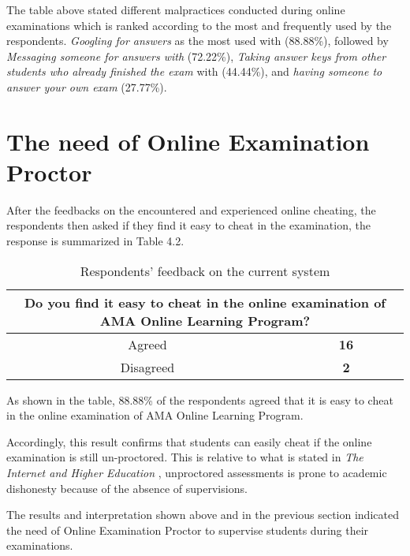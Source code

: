 The table above stated different malpractices conducted during online examinations which is ranked according to the most and frequently used by the respondents.
\emph{Googling for answers} as the most used with (88.88\%), followed by \emph{Messaging someone for answers with} (72.22\%), \emph{Taking answer keys from other students who already finished the exam} with (44.44\%), and \emph{having someone to answer your own exam} (27.77\%).

\section{The need of Online Examination Proctor}

After the feedbacks on the encountered and experienced online cheating, the respondents then asked if they find it easy to cheat in the examination, the response is summarized in Table 4.2.

\begin{table}[h!]
   \begin{center}
      \begin{tabular}{|c|c|}
         \hline
         \multicolumn{2}{|m{20em}|}{Do you find it easy to cheat in the online examination of AMA Online Learning Program?} \\
         \hline
         Agreed    & \textbf{16}                                                                                            \\
         \hline
         Disagreed & \textbf{2}                                                                                             \\
         \hline
      \end{tabular}
   \end{center}
   \caption{Respondents' feedback on the current system}
\end{table}

As shown in the table, 88.88\% of the respondents agreed that it is easy to cheat in the online examination of AMA Online Learning Program.

Accordingly, this result confirms that students can easily cheat if the online examination is still un-proctored.
This is relative to what is stated in \emph{The Internet and Higher Education} \cite{arnold2016cheating}, unproctored assessments is prone to academic dishonesty because of the absence of supervisions.

The results and interpretation shown above and in the previous section indicated the need of Online Examination Proctor to supervise students during their examinations.


